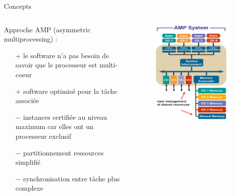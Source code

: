 \documentclass{beamer}
\begin{document}
\begin{frame}{Concepts}
	\begin{columns}
		\begingroup
		\small
		\hspace{0.3cm}
		\begin{column}{0.55\paperwidth}
			Approche AMP (asymmetric multi\-processing) :
				\begin{itemize}
					\item[$+$] le software n'a pas besoin de savoir que le processeur est
						multi-coeur
					\item[$+$] software optimisé pour la tâche associée
					\item[$-$] instances certifiée au niveau maximum car elles ont un
						processeur exclusif 
					\item[$-$] partitionnement ressources simplifié
					\item[$-$] synchronisation entre tâche plus complexe
				\end{itemize}
		\end{column}
		\endgroup
		\begin{column}{0.45\paperwidth}
			\begin{figure}
				\centering
				\includegraphics[width=0.7\linewidth]{amp.png}
			\end{figure}	
		\end{column}
	\end{columns}
\end{frame}
\end{document}

